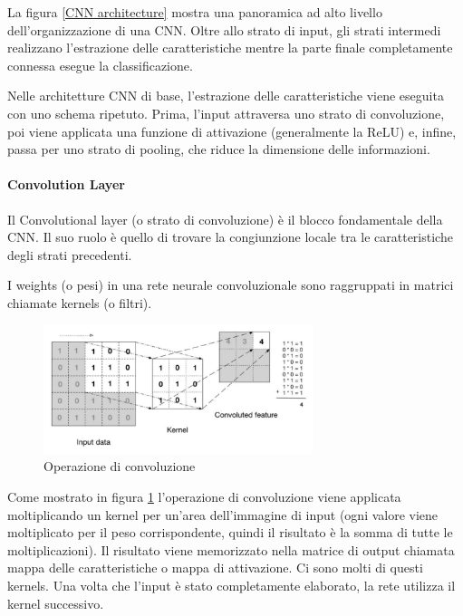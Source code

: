         La figura \ref{CNN architecture} mostra una panoramica ad alto livello dell'organizzazione di una CNN. Oltre allo strato di input, gli strati intermedi realizzano l'estrazione delle caratteristiche mentre la parte finale completamente connessa esegue la classificazione.
        
        Nelle architetture CNN di base, l'estrazione delle caratteristiche viene eseguita con uno schema ripetuto. Prima, l'input attraversa uno strato di convoluzione, poi viene applicata una funzione di attivazione (generalmente la ReLU) e, infine, passa per uno strato di pooling, che riduce la dimensione delle informazioni.
        
        \paragraph{Convolution Layer}
        Il Convolutional layer (o strato di convoluzione) è il blocco fondamentale della CNN. Il suo ruolo è quello di trovare la congiunzione locale tra le caratteristiche degli strati precedenti.
        
        I weights (o pesi) in una rete neurale convoluzionale sono raggruppati in matrici chiamate kernels (o filtri).
            \begin{figure}[!h]
                \centering
                \includegraphics[width=0.7\textwidth]{Images/NN/Convolutional Layer.png}
                \caption{Operazione di convoluzione}
                \label{Convolution}
            \end{figure}
        
        \newpage
        Come mostrato in figura \ref{Convolution} l'operazione di convoluzione viene applicata moltiplicando un kernel per un'area dell'immagine di input (ogni valore viene moltiplicato per il peso corrispondente, quindi il risultato è la somma di tutte le moltiplicazioni). Il risultato viene memorizzato nella matrice di output chiamata mappa delle caratteristiche o mappa di attivazione. Ci sono molti di questi kernels. Una volta che l'input è stato completamente elaborato, la rete utilizza il kernel successivo. 
        

